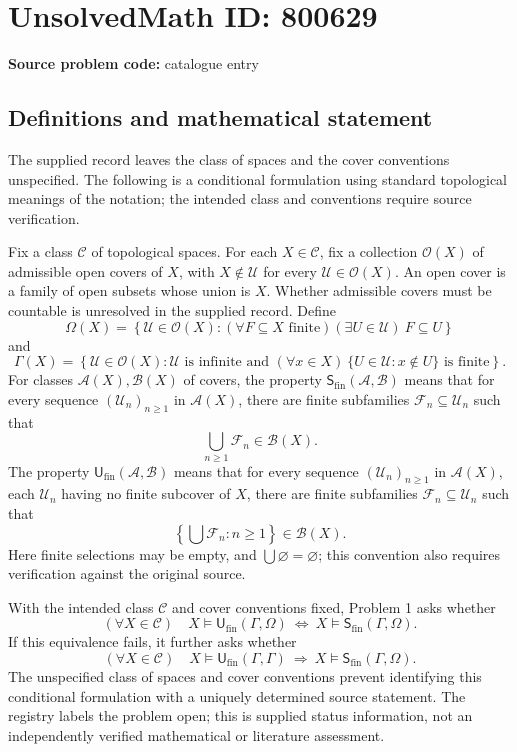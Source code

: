 \documentclass[11pt]{article}
\begin{document}
\section*{UnsolvedMath ID: 800629}
\textbf{Source problem code:} catalogue entry
\subsection{Definitions and mathematical statement}
The supplied record leaves the class of spaces and the cover conventions unspecified. The following is a conditional formulation using standard topological meanings of the notation; the intended class and conventions require source verification.

Fix a class \(\mathcal C\) of topological spaces. For each \(X\in\mathcal C\), fix a collection \(\mathscr O(X)\) of admissible open covers of \(X\), with \(X\notin\mathcal U\) for every \(\mathcal U\in\mathscr O(X)\). An open cover is a family of open subsets whose union is \(X\). Whether admissible covers must be countable is unresolved in the supplied record. Define
\[
\Omega(X)=\left\{\mathcal U\in\mathscr O(X): (\forall F\subseteq X\text{ finite})(\exists U\in\mathcal U)\ F\subseteq U\right\}
\]
and
\[
\Gamma(X)=\left\{\mathcal U\in\mathscr O(X):\mathcal U\text{ is infinite and }(\forall x\in X)\ \{U\in\mathcal U:x\notin U\}\text{ is finite}\right\}.
\]
For classes \(\mathcal A(X),\mathcal B(X)\) of covers, the property \(\mathsf S_{\mathrm{fin}}(\mathcal A,\mathcal B)\) means that for every sequence \((\mathcal U_n)_{n\geq1}\) in \(\mathcal A(X)\), there are finite subfamilies \(\mathcal F_n\subseteq\mathcal U_n\) such that
\[
\bigcup_{n\geq1}\mathcal F_n\in\mathcal B(X).
\]
The property \(\mathsf U_{\mathrm{fin}}(\mathcal A,\mathcal B)\) means that for every sequence \((\mathcal U_n)_{n\geq1}\) in \(\mathcal A(X)\), each \(\mathcal U_n\) having no finite subcover of \(X\), there are finite subfamilies \(\mathcal F_n\subseteq\mathcal U_n\) such that
\[
\left\{\bigcup\mathcal F_n:n\geq1\right\}\in\mathcal B(X).
\]
Here finite selections may be empty, and \(\bigcup\varnothing=\varnothing\); this convention also requires verification against the original source.

With the intended class \(\mathcal C\) and cover conventions fixed, Problem 1 asks whether
\[
(\forall X\in\mathcal C)\quad
X\models\mathsf U_{\mathrm{fin}}(\Gamma,\Omega)
\ \Longleftrightarrow\
X\models\mathsf S_{\mathrm{fin}}(\Gamma,\Omega).
\]
If this equivalence fails, it further asks whether
\[
(\forall X\in\mathcal C)\quad
X\models\mathsf U_{\mathrm{fin}}(\Gamma,\Gamma)
\ \Longrightarrow\
X\models\mathsf S_{\mathrm{fin}}(\Gamma,\Omega).
\]
The unspecified class of spaces and cover conventions prevent identifying this conditional formulation with a uniquely determined source statement. The registry labels the problem open; this is supplied status information, not an independently verified mathematical or literature assessment.
\end{document}
